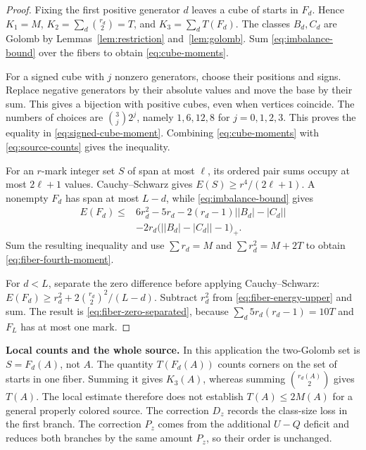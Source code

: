 \documentclass[11pt,a4paper]{article}
\newif\ifshowrevisions
\newenvironment{revision}{\par\begingroup\ifshowrevisions\color{red}\fi}{\par\endgroup}
\theoremstyle{definition}
\numberwithin{equation}{section}
\begin{document}
\begin{proof}
Fixing the first positive generator $d$ leaves a cube of starts in
$F_d$. Hence $K_1=M$, $K_2=\sum_d\binom{r_d}{2}=T$, and
$K_3=\sum_dT(F_d)$. The classes $B_d,C_d$ are Golomb by
Lemmas~\ref{lem:restriction} and~\ref{lem:golomb}.
Sum \eqref{eq:imbalance-bound} over the fibers to obtain
\eqref{eq:cube-moments}.

For a signed cube with $j$ nonzero generators, choose their positions
and signs. Replace negative generators by their absolute values and
move the base by their sum. This gives a bijection with
positive cubes, even when vertices coincide. The numbers of choices
are $\binom3j2^j$, namely $1,6,12,8$ for $j=0,1,2,3$.
This proves the equality in \eqref{eq:signed-cube-moment}.
Combining \eqref{eq:cube-moments} with
\eqref{eq:source-counts} gives the inequality.

For an $r$-mark integer set $S$ of span at most $\ell$, its ordered
pair sums occupy at most $2\ell+1$ values. Cauchy--Schwarz gives
$E(S)\ge r^4/(2\ell+1)$.
A nonempty $F_d$ has span at most $L-d$, while
\eqref{eq:imbalance-bound} gives
\begin{equation}\label{eq:fiber-energy-upper}
\begin{split}
E(F_d)\le{}&6r_d^2-5r_d-2(r_d-1)\bigl||B_d|-|C_d|\bigr|\\
&-2r_d\bigl(\bigl||B_d|-|C_d|\bigr|-1\bigr)_+.
\end{split}
\end{equation}
Sum the resulting inequality and use
$\sum r_d=M$ and $\sum r_d^2=M+2T$ to obtain
\eqref{eq:fiber-fourth-moment}.

For $d<L$, separate the zero difference before applying Cauchy--Schwarz:
$E(F_d)\ge r_d^2+2\binom{r_d}{2}^2/(L-d)$.
Subtract $r_d^2$ from \eqref{eq:fiber-energy-upper} and sum.
The result is \eqref{eq:fiber-zero-separated}, because
$\sum_d5r_d(r_d-1)=10T$ and $F_L$ has at most one mark.
\end{proof}

\begin{revision}
\medskip\noindent\textbf{Local counts and the whole source.}
In this application the two-Golomb set is $S=F_d(A)$, not $A$.
The quantity $T(F_d(A))$ counts corners on the set of starts in one
fiber. Summing it gives $K_3(A)$, whereas summing
$\binom{r_d(A)}2$ gives $T(A)$. The local estimate therefore does not
establish $T(A)\le2M(A)$ for a general properly colored source.
The correction $D_z$ records the class-size loss in the first branch.
The correction $P_z$ comes from the additional $U-Q$ deficit and reduces
both branches by the same amount $P_z$, so their order is unchanged.
\end{revision}
\end{document}
